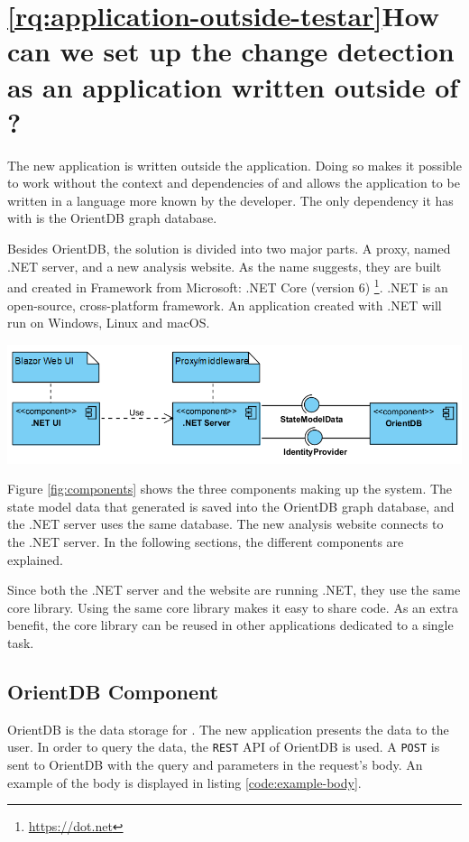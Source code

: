 
\section{\ref{rq:application-outside-testar}How can we set up the change detection as an application written outside of \testar?} \label{sec:components-explained}
The new application is written outside the \testar application. Doing so makes it possible to work without the context and dependencies of \testar and allows the application to be written in a language more known by the developer. The only dependency it has with \testar is the OrientDB graph database.

Besides OrientDB, the solution is divided into two major parts. A \testar proxy, named .NET server, and a new \testar analysis website. As the name suggests, they are built and created in Framework from Microsoft: .NET Core (version 6) \footnote{\url{https://dot.net}}. .NET is an open-source, cross-platform framework. An application created with .NET will run on Windows, Linux and macOS. 

\begingroup
\captionsetup{type=figure}
\includegraphics[scale=0.7]{images/server-ui-comp.png}
\label{fig:components}
\endgroup

Figure \ref{fig:components} shows the three components making up the system. The state model data that \testar generated is saved into the OrientDB graph database, and the .NET server uses the same database. The new \testar analysis website connects to the .NET server. In the following sections, the different components are explained. 

Since both the .NET server and the website are running .NET, they use the same core library. Using the same core library makes it easy to share code. As an extra benefit, the core library can be reused in other applications dedicated to a single task. 

\subsection{OrientDB Component}
OrientDB is the data storage for \testar. The new application presents the data to the user. In order to query the data, the \verb|REST| API of OrientDB is used. A \verb|POST| is sent to OrientDB with the query and parameters in the request's body. An example of the body is displayed in listing \ref{code:example-body}.

